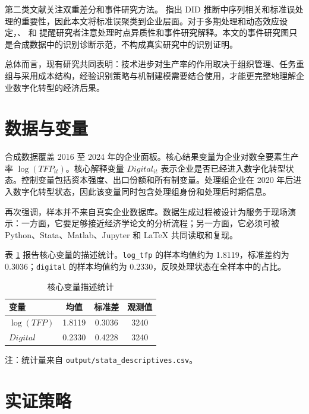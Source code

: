 \documentclass[11pt]{ctexart}
\begin{document}
第二类文献关注双重差分和事件研究方法。\citet{BertrandDufloMullainathan2004} 指出 DID 推断中序列相关和标准误处理的重要性，因此本文将标准误聚类到企业层面。对于多期处理和动态效应设定，\citet{CallawaySantAnna2021}、\citet{SunAbraham2021} 和 \citet{GoodmanBacon2021} 提醒研究者注意处理时点异质性和事件研究解释。本文的事件研究图只是合成数据中的识别诊断示范，不构成真实研究中的识别证明。

总体而言，现有研究共同表明：技术进步对生产率的作用取决于组织管理、任务重组与采用成本结构，经验识别策略与机制建模需要结合使用，才能更完整地理解企业数字化转型的经济后果。

\section{数据与变量}

合成数据覆盖 2016 至 2024 年的企业面板。核心结果变量为企业对数全要素生产率 $\log(TFP_{it})$。核心解释变量 $Digital_{it}$ 表示企业是否已经进入数字化转型状态。控制变量包括资本强度、出口份额和所有制变量。处理组企业在 2020 年后进入数字化转型状态，因此该变量同时包含处理组身份和处理后时期信息。

再次强调，样本并不来自真实企业数据库。数据生成过程被设计为服务于现场演示：一方面，它要足够接近经济学论文的分析流程；另一方面，它必须可被 Python、Stata、Matlab、Jupyter 和 \LaTeX{} 共同读取和复现。

表 \ref{tab:descriptives} 报告核心变量的描述统计。\texttt{log\_tfp} 的样本均值约为 1.8119，标准差约为 0.3036；\texttt{digital} 的样本均值约为 0.2330，反映处理状态在全样本中的占比。

\begin{table}[htbp]
\centering
\caption{核心变量描述统计}
\label{tab:descriptives}
\begin{tabular}{lccc}
\toprule
变量 & 均值 & 标准差 & 观测值 \\
\midrule
$\log(TFP)$ & 1.8119 & 0.3036 & 3240 \\
$Digital$ & 0.2330 & 0.4228 & 3240 \\
\bottomrule
\end{tabular}
\begin{flushleft}
\footnotesize 注：统计量来自 \texttt{output/stata\_descriptives.csv}。
\end{flushleft}
\end{table}

\section{实证策略}
\end{document}
